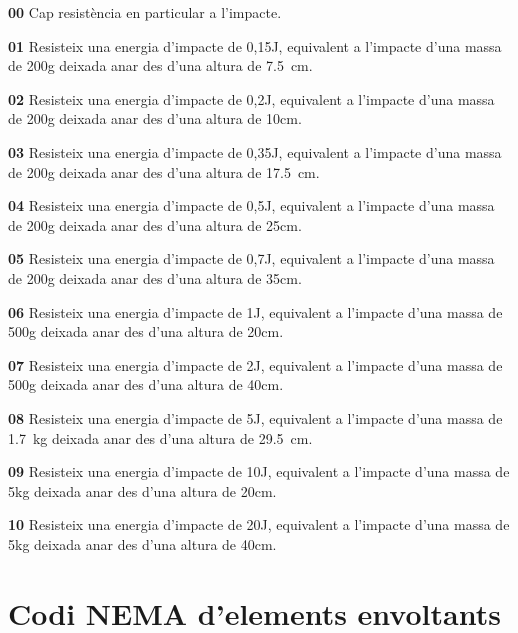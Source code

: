 \begin{list}{}
   {\setlength{\labelwidth}{10mm} \setlength{\leftmargin}{10mm} \setlength{\labelsep}{2mm}}
   \item[\textbf{00}] Cap resist\`{e}ncia en particular a l'impacte.
   \item[\textbf{01}] Resisteix una energia d'impacte de 0,15\unit{J}, equivalent a l'impacte d'una massa de 200\unit{g} deixada anar des d'una altura de \SI{7,5}{cm}.
   \item[\textbf{02}] Resisteix una energia d'impacte de 0,2\unit{J}, equivalent a l'impacte d'una massa de 200\unit{g} deixada anar des d'una altura de 10\unit{cm}.
   \item[\textbf{03}] Resisteix una energia d'impacte de 0,35\unit{J}, equivalent a l'impacte d'una massa de 200\unit{g} deixada anar des d'una altura de \SI{17,5}{cm}.
   \item[\textbf{04}] Resisteix una energia d'impacte de 0,5\unit{J}, equivalent a l'impacte d'una massa de 200\unit{g} deixada anar des d'una altura de 25\unit{cm}.
   \item[\textbf{05}] Resisteix una energia d'impacte de 0,7\unit{J}, equivalent a l'impacte d'una massa de 200\unit{g} deixada anar des d'una altura de 35\unit{cm}.
   \item[\textbf{06}]Resisteix una energia d'impacte de 1\unit{J}, equivalent a l'impacte d'una massa de 500\unit{g} deixada anar des d'una altura de 20\unit{cm}.
   \item[\textbf{07}]Resisteix una energia d'impacte de 2\unit{J}, equivalent a l'impacte d'una massa de 500\unit{g} deixada anar des d'una altura de 40\unit{cm}.
   \item[\textbf{08}]Resisteix una energia d'impacte de 5\unit{J}, equivalent a l'impacte d'una massa de \SI{1,7}{kg} deixada anar des d'una altura de \SI{29,5}{cm}.
   \item[\textbf{09}]Resisteix una energia d'impacte de 10\unit{J}, equivalent a l'impacte d'una massa de 5\unit{kg} deixada anar des d'una altura de 20\unit{cm}.
   \item[\textbf{10}]Resisteix una energia d'impacte de 20\unit{J}, equivalent a l'impacte d'una massa de 5\unit{kg} deixada anar des d'una altura de 40\unit{cm}.
\end{list}



\section{Codi NEMA d'elements envoltants}
 

